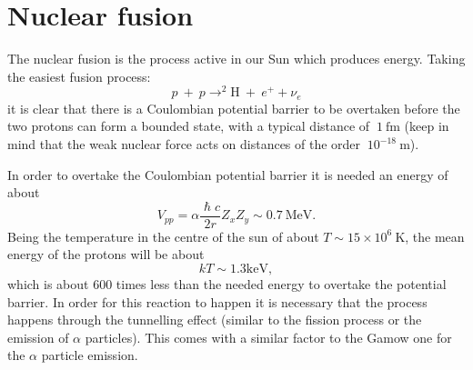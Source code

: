 \section{Nuclear fusion}
The nuclear fusion is the process active in our Sun which produces energy. Taking the easiest fusion process:
\begin{equation*}
    p~+~p \rightarrow ^{2}\mbox{H}~+~e^{+} + \nu_e
\end{equation*}
it is clear that there is a Coulombian potential barrier to be overtaken before the two protons can form a bounded state, with a typical distance of $~1~\mbox{fm}$ (keep in mind that the weak nuclear force acts on distances of the order $~10^{-18}~\mbox{m}$).

In order to overtake the Coulombian potential barrier it is needed an energy of about
\begin{equation*}
    V_{pp} = \alpha\frac{\hslash c}{2r}Z_{x}Z_{y} \sim 0.7 ~\mbox{MeV}. 
\end{equation*}
Being the temperature in the centre of the sun of about $T \sim 15 \times 10^6~\mbox{K}$, the mean energy of the protons will be about
\begin{equation*}
    kT \sim 1.3\mbox{keV},
\end{equation*}
which is about 600 times less than the needed energy to overtake the potential barrier. In order for this reaction to happen it is necessary that the process happens through the tunnelling effect (similar to the fission process or the emission of $\alpha$ particles). This comes with a similar factor to the Gamow one for the $\alpha$ particle emission.


